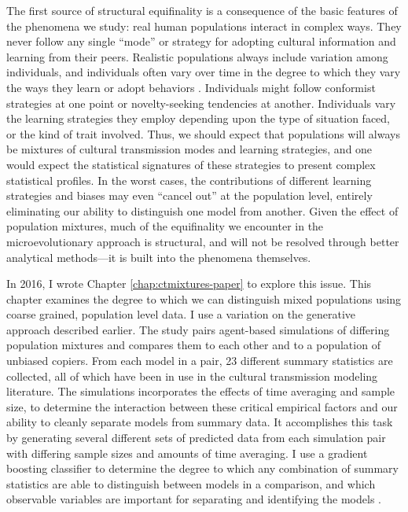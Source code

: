 The first source of structural equifinality is a consequence of the basic features of the phenomena we study: real human populations interact in complex ways. They never follow any single ``mode'' or strategy for adopting cultural information and learning from their peers. Realistic populations always include variation among individuals, and individuals often vary over time in the degree to which they vary the ways they learn or adopt behaviors . Individuals might follow conformist strategies at one point or novelty-seeking tendencies at another. Individuals vary the learning strategies they employ depending upon the type of situation faced, or the kind of trait involved. Thus, we should expect that populations will always be mixtures of cultural transmission modes and learning strategies, and one would expect the statistical signatures of these strategies to present complex statistical profiles. In the worst cases, the contributions of different learning strategies and biases may even ``cancel out'' at the population level, entirely eliminating our ability to distinguish one model from another. Given the effect of population mixtures, much of the equifinality we encounter in the microevolutionary approach is structural, and will not be resolved through better analytical methods—it is built into the phenomena themselves. 

In 2016, I wrote Chapter \ref{chap:ctmixtures-paper} to explore this issue. This chapter examines the degree to which we can distinguish mixed populations using coarse grained, population level data.  I use a variation on the generative approach described earlier. The study pairs agent-based simulations of differing population mixtures and compares them to each other and to a population of unbiased copiers. From each model in a pair, 23 different summary statistics are collected, all of which have been in use in the cultural transmission modeling literature. The simulations incorporates the effects of time averaging and sample size, to determine the interaction between these critical empirical factors and our ability to cleanly separate models from summary data. It accomplishes this task by generating several different sets of predicted data from each simulation pair with differing sample sizes and amounts of time averaging. I use a gradient boosting classifier to determine the degree to which any combination of summary statistics are able to distinguish between models in a comparison, and which observable variables are important for separating and identifying the models \citep{AlexeyNatekin2013,Friedman2000,hastie2009elements}.

